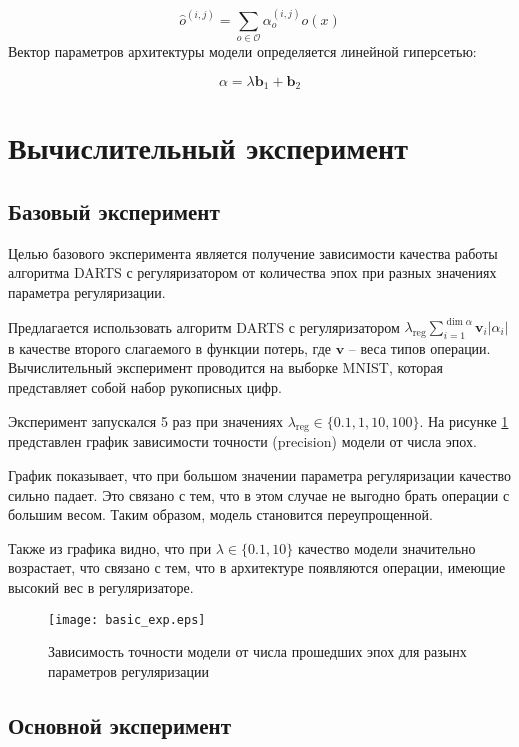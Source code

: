 \documentclass[12pt, twoside]{article}
\begin{document}
 $$\hat{o}^{(i, j)} = \sum_{o\in \mathcal{O}}\alpha^{(i, j)}_oo(x)$$
Вектор параметров архитектуры модели определяется линейной гиперсетью:

$$\alpha = \lambda\mathbf{b}_1 + \mathbf{b}_2$$


 
 \section{Вычислительный эксперимент}
 
 \subsection{Базовый эксперимент}
 Целью базового эксперимента является получение зависимости качества работы алгоритма DARTS с регуляризатором от количества эпох при разных значениях параметра регуляризации.
 
 Предлагается использовать алгоритм DARTS с регуляризатором $\lambda_{\text{reg}}\sum_{i=1}^{\dim\alpha}\mathbf{v}_i|\alpha_i|$ в качестве второго слагаемого в функции потерь, где $\mathbf{v}$ -- веса типов операции. Вычислительный эксперимент проводится на выборке MNIST\cite{lecun-mnisthandwrittendigit-2010}, которая представляет собой набор рукописных цифр.
 
Эксперимент запускался 5 раз при значениях $\lambda_{\text{reg}} \in \{0.1, 1, 10, 100\}$. На рисунке \ref{fig:basic_exp} представлен график зависимости точности (precision) модели от числа эпох.

График показывает, что при большом значении параметра регуляризации качество сильно падает. Это связано с тем, что в этом случае не выгодно брать операции с большим весом. Таким образом, модель становится переупрощенной.

 Также из графика видно, что при $\lambda \in \{0.1, 10\}$ качество модели значительно возрастает, что связано с тем, что в архитектуре появляются операции, имеющие высокий вес в регуляризаторе.

\begin{figure}[H]
\centering
  \texttt{[image: basic\_exp.eps]}
  \caption{Зависимость точности модели от числа прошедших эпох для разынх параметров регуляризации}
  \label{fig:basic_exp}
\end{figure}

\subsection{Основной эксперимент}
\end{document}
